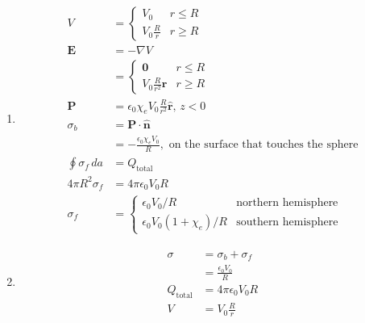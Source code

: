 \documentclass{article}
\renewcommand{\vec}[1]{\boldsymbol{\mathbf{#1}}}
\newcommand{\uvec}[1]{\hat{\vec{#1}}}
\begin{document}
\begin{enumerate}
  \item

        \begin{align*}
          V                    & = \begin{cases}
                                     V_0             & r \le R \\
                                     V_0 \frac{R}{r} & r \ge R
                                   \end{cases}                                                        \\
          \vec{E}              & = -\nabla V                                                                        \\
                               & = \begin{cases}
                                     \vec{0}                    & r \le R \\
                                     V_0 \frac{R}{r^2} \uvec{r} & r \ge R
                                   \end{cases}                                             \\
          \vec{P}              & = \epsilon_0 \chi_e V_0 \frac{R}{r^2} \uvec{r}, \,z < 0                            \\
          \sigma_b             & = \vec{P} \cdot \uvec{n}                                                           \\
                               & = -\frac{\epsilon_0 \chi_e V_0}{R}, \text{ on the surface that touches the sphere} \\
          \oint \sigma_f \,d a & = Q_\text{total}                                                                   \\
          4 \pi R^2 \sigma_f   & = 4 \pi \epsilon_0 V_0 R                                                           \\
          \sigma_f             & = \begin{cases}
                                     \epsilon_0 V_0 / R              & \text{northern hemisphere} \\
                                     \epsilon_0 V_0 (1 + \chi_e) / R & \text{southern hemisphere}
                                   \end{cases}
        \end{align*}

  \item

        \begin{align*}
          \sigma         & = \sigma_b + \sigma_f      \\
                         & = \frac{\epsilon_0 V_0}{R} \\
          Q_\text{total} & = 4 \pi \epsilon_0 V_0 R   \\
          V              & = V_0 \frac{R}{r}
        \end{align*}
\end{enumerate}
\end{document}
